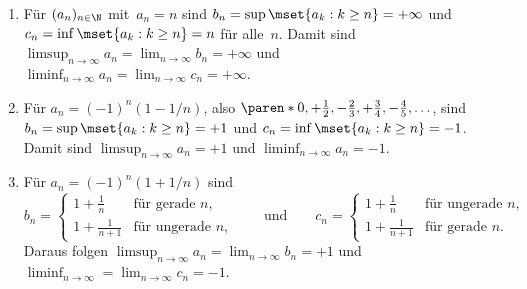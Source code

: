 \documentclass[a4paper]{article}
\begin{document}
\begin{example}\leavevmode
    \begin{enumerate}
        \item Für $(a_n)_{n\in\N}$ mit~$a_n = n$ sind $b_n = \sup\mset{a_k : k \geq n} = +\infty$ und $c_n = \inf\mset{a_k : k \geq n} = n$ für alle~$n$. Damit sind $\limsup_{n\to\infty} a_n = \lim_{n\to\infty} b_n = +\infty$ und $\liminf_{n\to\infty} a_n = \lim_{n\to\infty} c_n = +\infty$.
        \item Für $a_n = (-1)^n (1-1/n)$, also $\paren*{0, +\frac{1}{2}, -\frac{2}{3}, +\frac{3}{4}, -\frac{4}{5}, \dots}$, sind $b_n = \sup\mset{a_k : k \geq n} = +1$ und $c_n = \inf\mset{a_k : k \geq n} = -1$. Damit sind $\limsup_{n\to\infty} a_n = +1$ und $\liminf_{n\to\infty} a_n = -1$.
        \item Für $a_n = (-1)^n (1+1/n)$ sind
              \begin{equation*}
                  b_n = \begin{cases}
                      1 + \frac{1}{n}   & \text{für gerade }n,   \\
                      1 + \frac{1}{n+1} & \text{für ungerade }n,
                  \end{cases}\qquad\text{und}\qquad
                  c_n = \begin{cases}
                      1 + \frac{1}{n}   & \text{für ungerade }n, \\
                      1 + \frac{1}{n+1} & \text{für gerade }n.
                  \end{cases}
              \end{equation*}
              Daraus folgen $\limsup_{n\to\infty} a_n = \lim_{n\to\infty} b_n = +1$ und $\liminf_{n\to\infty} = \lim_{n\to\infty} c_n = -1$.


\end{enumerate}
\end{example}
\end{document}
